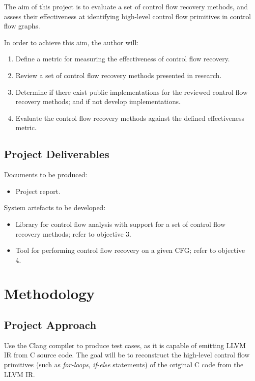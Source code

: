 \documentclass[12pt, a4paper]{article}
\begin{document}
The aim of this project is to evaluate a set of control flow recovery methods, and assess their effectiveness at identifying high-level control flow primitives in control flow graphs.

In order to achieve this aim, the author will:

\begin{enumerate}
	\item Define a metric for measuring the effectiveness of control flow recovery.
	\item Review a set of control flow recovery methods presented in research.
	\item Determine if there exist public implementations for the reviewed control flow recovery methods; and if not develop implementations.
	\item Evaluate the control flow recovery methods against the defined effectiveness metric.
\end{enumerate}

\subsection{Project Deliverables}

Documents to be produced:

\begin{itemize}
	\item Project report.
\end{itemize}

System artefacts to be developed:

\begin{itemize}
	\item Library for control flow analysis with support for a set of control flow recovery methods; refer to objective 3.
	\item Tool for performing control flow recovery on a given CFG; refer to objective 4.
\end{itemize}

\clearpage

\section{Methodology}

\subsection{Project Approach}

Use the Clang compiler to produce test cases, as it is capable of emitting LLVM IR from C source code. The goal will be to reconstruct the high-level control flow primitives (such as \textit{for-loops}, \textit{if-else} statements) of the original C code from the LLVM IR.
\end{document}
